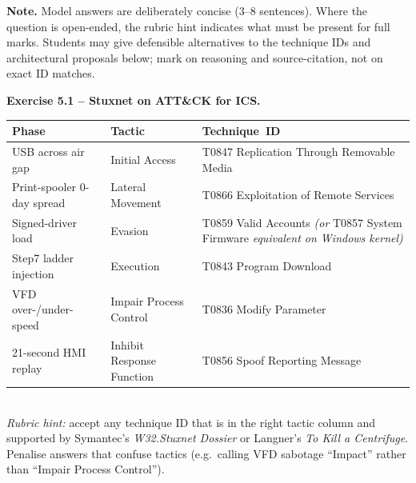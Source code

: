 \documentclass[11pt,a4paper]{article}
\begin{document}
\sheetheader

\noindent
\textbf{Note.} Model answers are deliberately concise (3--8 sentences). Where the question is
open-ended, the rubric hint indicates what must be present for full marks. Students may give
defensible alternatives to the technique IDs and architectural proposals below; mark on
reasoning and source-citation, not on exact ID matches.

\begin{solutionbox}
\textbf{Exercise 5.1 -- Stuxnet on ATT\&CK for ICS.}\\[2pt]
\begin{tabular}{p{4.4cm} p{4cm} p{6.0cm}}
\toprule
\textbf{Phase} & \textbf{Tactic} & \textbf{Technique~ID} \\
\midrule
USB across air gap & Initial Access      & T0847 Replication Through Removable Media \\
Print-spooler 0-day spread & Lateral Movement & T0866 Exploitation of Remote Services \\
Signed-driver load & Evasion        & T0859 Valid Accounts \emph{(or} T0857 System Firmware \emph{equivalent on Windows kernel)} \\
Step7 ladder injection & Execution      & T0843 Program Download \\
VFD over-/under-speed  & Impair Process Control & T0836 Modify Parameter \\
21-second HMI replay   & Inhibit Response Function & T0856 Spoof Reporting Message \\
\bottomrule
\end{tabular}\\[3pt]
\emph{Rubric hint:} accept any technique ID that is in the right tactic column and supported
by Symantec's \emph{W32.Stuxnet Dossier} or Langner's \emph{To Kill a Centrifuge}. Penalise
answers that confuse tactics (e.g.\ calling VFD sabotage ``Impact'' rather than ``Impair
Process Control'').
\end{solutionbox}
\end{document}

